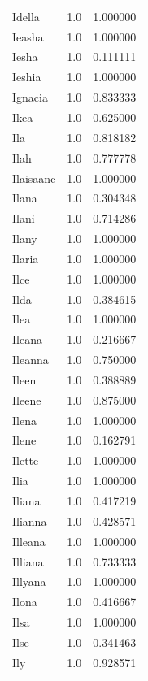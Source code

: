 \documentclass[
  letterpaper,
  DIV=11,
  numbers=noendperiod]{scrreprt}
\begin{document}
\begin{tabular}{lrr}
Idella          &   1.0 &   1.000000 \\
Ieasha          &   1.0 &   1.000000 \\
Iesha           &   1.0 &   0.111111 \\
Ieshia          &   1.0 &   1.000000 \\
Ignacia         &   1.0 &   0.833333 \\
Ikea            &   1.0 &   0.625000 \\
Ila             &   1.0 &   0.818182 \\
Ilah            &   1.0 &   0.777778 \\
Ilaisaane       &   1.0 &   1.000000 \\
Ilana           &   1.0 &   0.304348 \\
Ilani           &   1.0 &   0.714286 \\
Ilany           &   1.0 &   1.000000 \\
Ilaria          &   1.0 &   1.000000 \\
Ilce            &   1.0 &   1.000000 \\
Ilda            &   1.0 &   0.384615 \\
Ilea            &   1.0 &   1.000000 \\
Ileana          &   1.0 &   0.216667 \\
Ileanna         &   1.0 &   0.750000 \\
Ileen           &   1.0 &   0.388889 \\
Ileene          &   1.0 &   0.875000 \\
Ilena           &   1.0 &   1.000000 \\
Ilene           &   1.0 &   0.162791 \\
Ilette          &   1.0 &   1.000000 \\
Ilia            &   1.0 &   1.000000 \\
Iliana          &   1.0 &   0.417219 \\
Ilianna         &   1.0 &   0.428571 \\
Illeana         &   1.0 &   1.000000 \\
Illiana         &   1.0 &   0.733333 \\
Illyana         &   1.0 &   1.000000 \\
Ilona           &   1.0 &   0.416667 \\
Ilsa            &   1.0 &   1.000000 \\
Ilse            &   1.0 &   0.341463 \\
Ily             &   1.0 &   0.928571 \\

\end{tabular}
\end{document}
